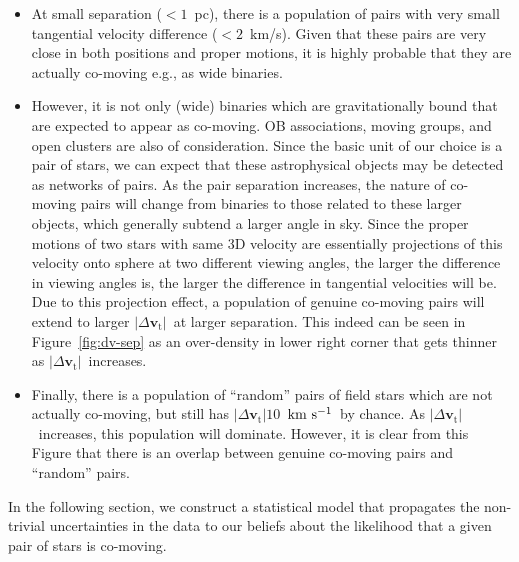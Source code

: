 \documentclass[manuscript, letterpaper]{aastex6}
\newcommand{\bs}[1]{\boldsymbol{#1}}
\renewcommand{\vec}[1]{\bs{#1}}
\newcommand{\kms}{\ensuremath{\rm km~s^{-1}}}
\newcommand{\absdvtan}{\ensuremath{|\Delta\vec v_\mathrm{t}|}}
\begin{document}
\begin{itemize}
  \item At small separation ($<1$~pc), there is a population of pairs with
  very small tangential velocity difference ($<2$~km/s). Given that these pairs
  are very close in both positions and proper motions,
  it is highly probable that they are actually co-moving e.g., as wide binaries.
  
  \item  However, it is not only (wide) binaries which are gravitationally
  bound that are expected to appear as co-moving.
  OB associations, moving groups, and open clusters are also of consideration.
  Since the basic unit of our choice is a pair of stars, we can expect that these astrophysical objects may be detected as networks of pairs.
  As the pair separation increases, the nature of co-moving pairs
  will change from binaries to those related to these larger objects,
  which generally subtend a larger angle in sky.
  Since the proper motions of two stars with same 3D velocity
  are essentially projections of this velocity onto sphere at
  two different viewing angles,
  the larger the difference in viewing angles is, the larger the difference in tangential 
  velocities will be.
  Due to this projection effect, a population of genuine co-moving pairs
  will extend to larger \absdvtan\ at larger separation.
  This indeed can be seen in Figure~\ref{fig:dv-sep} as an over-density
  in lower right corner that gets thinner as \absdvtan\ increases.
  
  \item Finally, there is a population of “random” pairs of field stars
  which are not actually co-moving, but still has $\absdvtan 10$~\kms\
  by chance.
  As \absdvtan\ increases, this population will dominate.
  However, it is clear from this Figure that there is an overlap between
  genuine co-moving pairs and “random” pairs.
\end{itemize}

In the following section, we construct a statistical model that propagates
the non-trivial uncertainties in the data to our beliefs about the likelihood
that a given pair of stars is co-moving.
\end{document}
